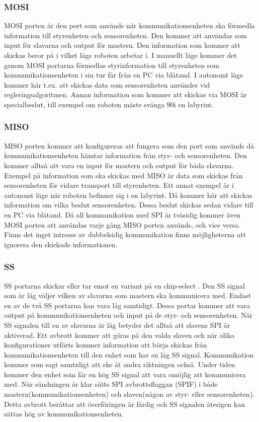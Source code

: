 \subsubsection{MOSI}
MOSI porten är den port som används när kommunikationsenheten ska förmedla
information till styrenheten och sensorenheten. Den kommer att användas som
input för slavarna och output för mastern. Den information som kommer att
skickas beror på i vilket läge roboten arbetar i. I manuellt läge kommer det
genom MOSI portarna förmedlas styrinformation till styrenheten som
kommunikationsenheten i sin tur får från en PC via blåtand. I autonomt läge
kommer här t.ex. att skickas data som sensorenheten använder vid
regleringsalgoritmen. Annan information som kommer att skickas via MOSI är
specialbeslut, till exempel om roboten måste svänga 90\degree i en labyrint.

\subsubsection{MISO}
MISO porten kommer att konfigureras att fungera som den port som används då kommunikationsenheten hämtar information från styr- och sensorenheten. Den kommer alltså att vara en input för mastern och output för båda slavarna. Exempel på information som ska skickas med MISO är data som skickas från sensorenheten för vidare transport till styrenheten. Ett annat exempel är i autonomt läge när roboten befinner sig i en labyrint. Då kommer här att skickas information om vilka beslut sensorenheten. Dessa beslut skickas sedan vidare till en PC via blåtand.
Då all kommunikation med SPI är tvåsidig kommer även MOSI porten att användas varje gång MISO porten används, och vice versa. Finns det inget intresse av dubbelsidig kommunikation finns möjligheterna att ignorera den skickade informationen.

\subsubsection{SS}
SS portarna skickar eller tar emot en variant på en chip-select . Den SS signal som är låg väljer vilken av slavarna som mastern ska kommunicera med. Endast en av de två SS portarna kan vara låg samtidigt. Dessa portar kommer att vara output på kommunikationsenheten och input på de styr- och sensorenheten.
När SS signalen till en av slavarna är låg betyder det alltså att slavens SPI är aktiverad. Ett avbrott kommer att göras på den valda slaven och när olika konfigurationer utförts kommer information att börja skickas från kommunikationsenheten till den enhet som har en låg SS signal. Kommunikation kommer som sagt samtidigt att ske åt andra riktningen också. Under tiden kommer den enhet som får en hög SS signal att vara omöjlig att kommunicera med.
När sändningen är klar sätts SPI avbrottsflaggan (SPIF) i både mastern(kommunikationsenheten) och slaven(någon av styr- eller sensorenheten). Detta avbrott berättar att överföringen är färdig och SS signalen återigen kan sättas hög av kommunikationsenheten.

